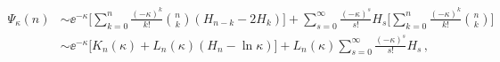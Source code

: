 \begin{equation}
\begin{split}
\Psi_\kappa(n) &\sim \ee^{-\kappa} \biggl[\sum_{k=0}^n 
\frac{(-\kappa)^k}{k!}\binom{n}{k} (H_{n-k}-2H_k) \biggr] +
\sum_{s=0}^{\infty} \frac{(-\kappa)^s}{s!} H_s
\biggl[\sum_{k=0}^n \frac{(-\kappa)^k}{k!} \binom{n}{k} \biggr]\\
&\sim \ee^{-\kappa}\bigl[K_n(\kappa) + L_n(\kappa)(H_n-\ln\kappa)\bigr]
+L_n(\kappa) \sum_{s=0}^\infty\frac{(-\kappa)^s}{s!}H_s\,,
\end{split}
\end{equation}

